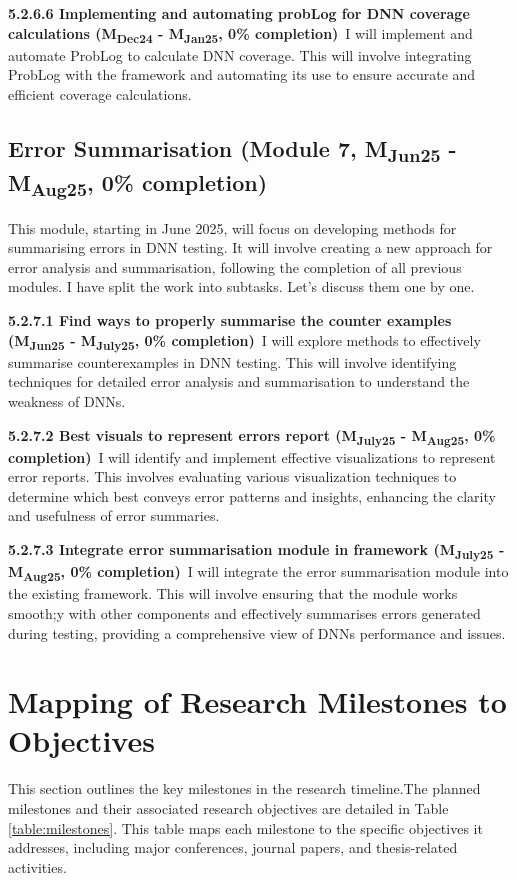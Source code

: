 \noindent \textbf{5.2.6.6 Implementing and automating probLog for DNN coverage calculations (M\textsubscript{Dec24} - M\textsubscript{Jan25}, 0\% completion)}\ I will implement and automate ProbLog to calculate DNN coverage. This will involve integrating ProbLog with the framework and automating its use to ensure accurate and efficient coverage calculations.

\subsection{Error Summarisation (Module 7, M\textsubscript{Jun25} - M\textsubscript{Aug25}, 0\% completion)}This module, starting in June 2025, will focus on developing methods for summarising errors in DNN testing. It will involve creating a new approach for error analysis and summarisation, following the completion of all previous modules. I have split the work into subtasks. Let's discuss them one by one.


\noindent \textbf{5.2.7.1 Find ways to properly summarise the counter examples (M\textsubscript{Jun25} - M\textsubscript{July25}, 0\% completion)}\ I will explore methods to effectively summarise counterexamples in DNN testing. This will involve identifying techniques for detailed error analysis and summarisation to understand the weakness of DNNs. 

\noindent \textbf{5.2.7.2 Best visuals to represent errors report (M\textsubscript{July25} - M\textsubscript{Aug25}, 0\% completion)}\ I will identify and implement effective visualizations to represent error reports. This involves evaluating various visualization techniques to determine which best conveys error patterns and insights, enhancing the clarity and usefulness of error summaries.

\noindent \textbf{5.2.7.3 Integrate error summarisation module in framework (M\textsubscript{July25} - M\textsubscript{Aug25}, 0\% completion)}\ I will integrate the error summarisation module into the existing framework. This will involve ensuring that the module works smooth;y with other components and effectively summarises errors generated during testing, providing a comprehensive view of DNNs performance and issues.

\section{Mapping of Research Milestones to Objectives}
This section outlines the key milestones in the research timeline.The planned milestones and their associated research objectives are detailed in Table \ref{table:milestones}. This table maps each milestone to the specific objectives it addresses, including major conferences, journal papers, and thesis-related activities.

